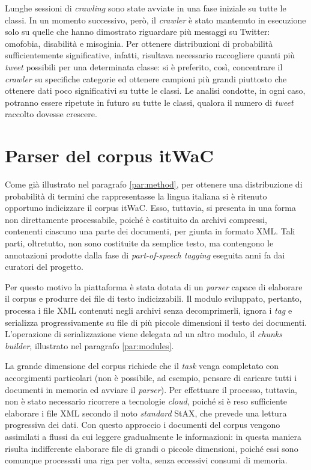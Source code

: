 Lunghe sessioni di \textit{crawling} sono state avviate in una fase iniziale su tutte le classi. In un momento successivo, però, il \textit{crawler} è stato mantenuto in esecuzione solo su quelle 
che hanno dimostrato riguardare più messaggi su Twitter: omofobia, disabilità e misoginia. Per ottenere distribuzioni di probabilità sufficientemente significative, infatti, risultava 
necessario raccogliere quanti più \textit{tweet} possibili per una determinata classe: si è preferito, così, concentrare il \textit{crawler} su specifiche categorie ed ottenere campioni più grandi 
piuttosto che ottenere dati poco significativi su tutte le classi. Le analisi condotte, in ogni caso, potranno essere ripetute in futuro su tutte le classi, qualora il numero di 
\textit{tweet} raccolto dovesse crescere.

\section{Parser del corpus itWaC}
\label{parseritwac}

Come già illustrato nel paragrafo \ref{par:method}, per ottenere una distribuzione di probabilità di termini che rappresentasse la lingua italiana si è ritenuto opportuno indicizzare il corpus itWaC. 
Esso, tuttavia, si presenta in una forma non direttamente processabile, poiché è costituito da archivi compressi, contenenti ciascuno una parte dei documenti, per giunta in 
formato XML. Tali parti, oltretutto, non sono costituite da semplice testo, ma contengono le annotazioni prodotte dalla fase di \textit{part-of-speech tagging} eseguita anni fa 
dai curatori del progetto.

Per questo motivo la piattaforma è stata dotata di un \textit{parser} capace di elaborare il corpus e produrre dei file di testo indicizzabili. Il modulo sviluppato, pertanto, processa i file 
XML contenuti negli archivi senza decomprimerli, ignora i \textit{tag} e serializza progressivamente su file di più piccole dimensioni il testo dei documenti. L'operazione di serializzazione
viene delegata ad un altro modulo, il \textit{chunks builder}, illustrato nel paragrafo \ref{par:modules}.

La grande dimensione del corpus richiede che il \textit{task} venga completato con accorgimenti particolari (non è possibile, ad esempio, pensare di caricare tutti i documenti in memoria ed avviare il \textit{parser}).
Per effettuare il processo, tuttavia, non è stato necessario ricorrere a tecnologie \textit{cloud}, poiché si è reso sufficiente elaborare i file XML secondo il noto \textit{standard} StAX, 
che prevede una lettura progressiva dei dati. Con questo approccio i documenti del corpus vengono 
assimilati a flussi da cui leggere gradualmente le informazioni: in questa maniera risulta indifferente elaborare file di grandi o piccole dimensioni, poiché essi sono comunque processati 
una riga per volta, senza eccessivi consumi di memoria.

